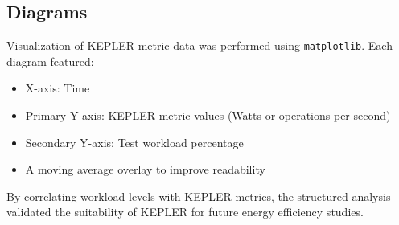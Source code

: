 \subsection{Diagrams}
Visualization of KEPLER metric data was performed using \texttt{matplotlib}. Each diagram featured:
\begin{itemize}
\item X-axis: Time
\item Primary Y-axis: KEPLER metric values (Watts or operations per second)
\item Secondary Y-axis: Test workload percentage
\item A moving average overlay to improve readability
\end{itemize}
By correlating workload levels with KEPLER metrics, the structured analysis validated the suitability of KEPLER for future energy efficiency studies.
